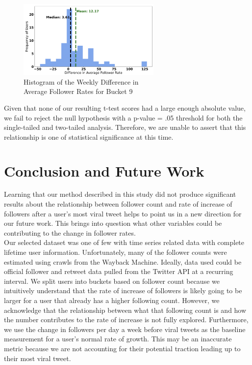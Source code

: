 \documentclass[twoside,twocolumn]{article}
\begin{document}
\begin{figure}[h]
\includegraphics[width=7cm]{p4.png}
\caption{Histogram of the Weekly Difference in \\Average Follower Rates for Bucket 9}
\end{figure}

Given that none of our resulting t-test scores had a large enough absolute value, we fail to reject the null hypothesis with a p-value = .05 threshold for both the single-tailed and two-tailed analysis. Therefore, we are unable to assert that this relationship is one of statistical significance at this time.\\


\section{Conclusion and Future Work}

Learning that our method described in this study did not produce significant results about the relationship between follower count and rate of increase of followers after a user's most viral tweet helps to point us in a new direction for our future work. This brings into question what other variables could be contributing to the change in follower rates. \\

Our selected dataset was one of few with time series related data with complete lifetime user information. Unfortunately, many of the follower counts were estimated using crawls from the Wayback Machine. Ideally, data used could be official follower and retweet data pulled from the Twitter API at a recurring interval. We split users into buckets based on follower count because we intuitively understand that the rate of increase of followers is likely going to be larger for a user that already has a higher following count. However, we acknowledge that the relationship between what that following count is and how the number contributes to the rate of increase is not fully explored. Furthermore, we use the change in followers per day a week before viral tweets as the baseline measurement for a user's normal rate of growth. This may be an inaccurate metric because we are not accounting for their potential traction leading up to their most viral tweet.\\
\end{document}
